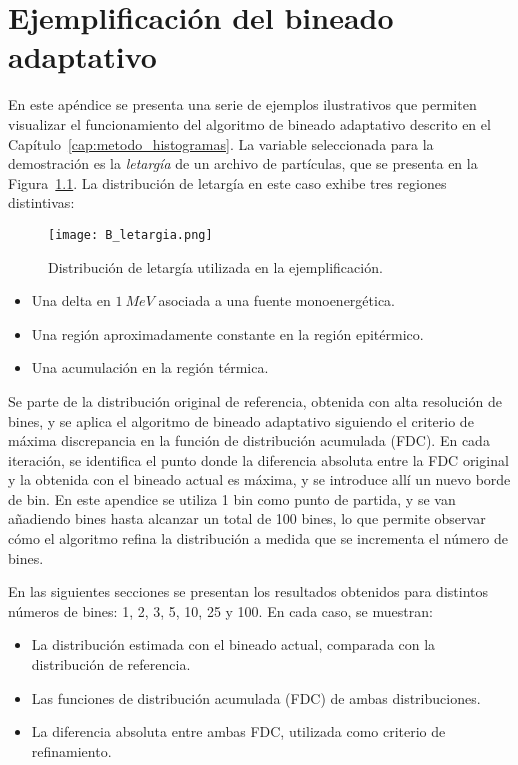 \chapter{Ejemplificación del bineado adaptativo}
\label{app:B}

En este apéndice se presenta una serie de ejemplos ilustrativos que permiten visualizar el funcionamiento del algoritmo de bineado adaptativo descrito en el Capítulo~\ref{cap:metodo_histogramas}. La variable seleccionada para la demostración es la \textit{letargía} de un archivo de partículas, que se presenta en la Figura~\ref{fig:B_letargia}. La distribución de letargía en este caso exhibe tres regiones distintivas:

\begin{figure}[H]
    \centering
    \texttt{[image: B\_letargia.png]}
    \caption{Distribución de letargía utilizada en la ejemplificación.}
    \label{fig:B_letargia}
\end{figure}

\begin{itemize}
    \item Una delta en $1~MeV$ asociada a una fuente monoenergética.
    \item Una región aproximadamente constante en la región epitérmico.
    \item Una acumulación en la región térmica.
\end{itemize}

Se parte de la distribución original de referencia, obtenida con alta resolución de bines, y se aplica el algoritmo de bineado adaptativo siguiendo el criterio de máxima discrepancia en la función de distribución acumulada (FDC). En cada iteración, se identifica el punto donde la diferencia absoluta entre la FDC original y la obtenida con el bineado actual es máxima, y se introduce allí un nuevo borde de bin. En este apendice se utiliza 1 bin como punto de partida, y se van añadiendo bines hasta alcanzar un total de 100 bines, lo que permite observar cómo el algoritmo refina la distribución a medida que se incrementa el número de bines.

En las siguientes secciones se presentan los resultados obtenidos para distintos números de bines: 1, 2, 3, 5, 10, 25 y 100. En cada caso, se muestran:

\begin{itemize}
    \item La distribución estimada con el bineado actual, comparada con la distribución de referencia.
    \item Las funciones de distribución acumulada (FDC) de ambas distribuciones.
    \item La diferencia absoluta entre ambas FDC, utilizada como criterio de refinamiento.
\end{itemize}

